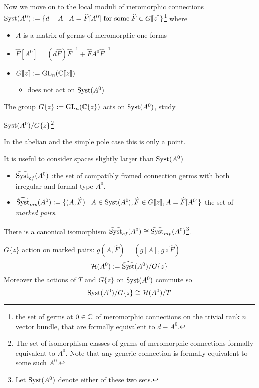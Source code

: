 \begin{frame}{Now we move on to the local moduli of meromorphic connections}
$\operatorname{Syst}(A^0):=\{d-A \mid A=\widehat{F}[A^0] \text{ for some } \widehat{F}\in
  G\llbracket z\rrbracket\}$\footnote{the set of germs at $0\in\mathbb{C}$ of
  meromorphic connections on the trivial rank $n$ vector bundle, that are
  formally equivalent to $d-A^0$.}
where
  \begin{itemize}
    \item $A$ is a matrix of germs of meromorphic one-forms
    \item $\hat{F}[A^0]=(d\hat{F})\hat{F}^{-1}+\hat{F}A^0\hat{F}^{-1}$
    \item $G\llbracket z\rrbracket:=\operatorname{GL}_n(\mathbb{C}\llbracket z\rrbracket)$
      \begin{itemize}
        \item does not act on $\operatorname{Syst}(A^0)$
      \end{itemize}
  \end{itemize}
  The group $G\{z\}:=\operatorname{GL}_n(\mathbb{C}\{z\})$ acts on $\operatorname{Syst}(A^0)$,  study
  \begin{center}
    $\operatorname{Syst}(A^0)/G\{z\}$\footnote{The set of isomorphism classes of germs of
    meromorphic connections formally equivalent to $A^0$. Note that any generic
    connection is formally equivalent to some such $A^0$.}
  \end{center}
  In the abelian and the simple pole case this is only a point.
\end{frame}

\begin{frame}{It is useful to consider spaces slightly larger than $\operatorname{Syst}(A^0)$}
  \begin{itemize}
    \item $\widehat{\operatorname{Syst}}_{cf}(A^0)$ :\Leftrightarrow the set of compatibly
      framed connection germs with both irregular and formal type $A^0$.
    \item $\widehat{\operatorname{Syst}}_{mp}(A^0):=\{(A,\widehat{F})\mid A\in\operatorname{Syst}(A^0)
      ,\widehat{F}\in G\llbracket z\rrbracket
      ,A=\widehat{F}[A^0]\}$
      the set of \emph{marked pairs}.
  \end{itemize}
  There is a canonical isomorphism
  $\widehat{\operatorname{Syst}}_{cf}(A^0)\cong\widehat{\operatorname{Syst}}_{mp}(A^0)$\footnote{Let
  $\operatorname{Syst}(A^0)$ denote either of these two sets.}.

  $G\{z\}$ action on marked pairs: $g(A,\hat{F})=(g[A],g\circ\hat{F})$
  \[
    \mathcal{H}(A^0):=\widehat{\operatorname{Syst}}(A^0)/G\{z\}
  \]
  Moreover the actions of $T$ and $G\{z\}$ on $\operatorname{Syst}(A^0)$ commute so
  \[
    \operatorname{Syst}(A^0)/G\{z\}\cong\mathcal{H}(A^0)/T
  \]
\end{frame}


